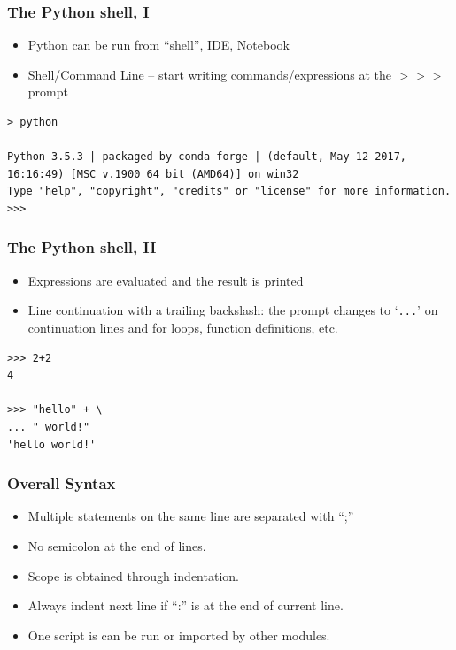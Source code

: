 \begin{frame}[fragile]  \frametitle{The Python shell, I}
  \begin{itemize}
  \item Python can be run from ``shell'', IDE, Notebook
  \item Shell/Command Line -- start writing commands/expressions at the $>>>$ prompt
  \end{itemize}
\begin{lstlisting}
> python

Python 3.5.3 | packaged by conda-forge | (default, May 12 2017, 16:16:49) [MSC v.1900 64 bit (AMD64)] on win32
Type "help", "copyright", "credits" or "license" for more information.
>>>
\end{lstlisting}
\end{frame}

\begin{frame}[fragile]\frametitle{The Python shell, II}
\begin{itemize}
\item Expressions are evaluated and the result is printed
\item Line continuation with a trailing backslash: the prompt changes to `\texttt{...}' on continuation lines and for loops, function definitions, etc.
\end{itemize}
\begin{lstlisting}
>>> 2+2
4

>>> "hello" + \
... " world!"
'hello world!'
\end{lstlisting}
\end{frame}

\begin{frame}[fragile]  \frametitle{Overall Syntax}
\begin{itemize}
\item Multiple statements on the same line are separated with ``;''
\item No semicolon at the end of lines.
\item Scope is obtained through indentation.
\item Always indent next line if ``:'' is at the end of current line.
\item One script is can be run or imported by other modules.
\end{itemize}
\end{frame}

